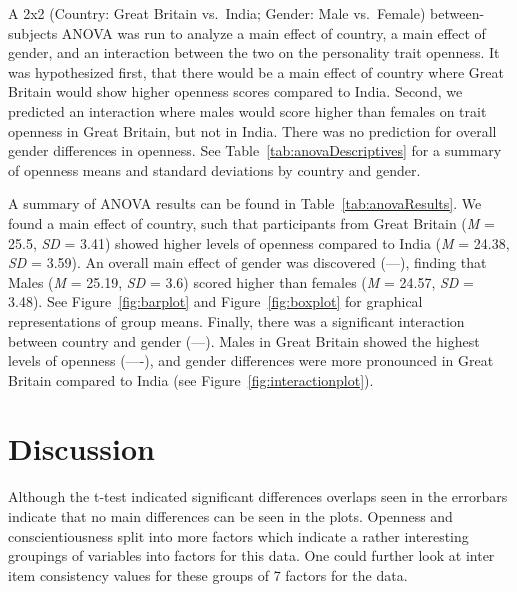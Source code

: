 \documentclass[
  english,
  man, fleqn, noextraspace]{apa6}
\begin{document}
A 2x2 (Country: Great Britain vs.~India; Gender: Male vs.~Female) between-subjects ANOVA was run to analyze a main effect of country, a main effect of gender, and an interaction between the two on the personality trait openness. It was hypothesized first, that there would be a main effect of country where Great Britain would show higher openness scores compared to India. Second, we predicted an interaction where males would score higher than females on trait openness in Great Britain, but not in India. There was no prediction for overall gender differences in openness. See Table~\ref{tab:anovaDescriptives} for a summary of openness means and standard deviations by country and gender.

A summary of ANOVA results can be found in Table~\ref{tab:anovaResults}. We found a main effect of country, such that participants from Great Britain (\emph{M} = 25.5, \emph{SD} = 3.41) showed higher levels of openness compared to India (\emph{M} = 24.38, \emph{SD} = 3.59). An overall main effect of gender was discovered (---), finding that Males (\emph{M} = 25.19, \emph{SD} = 3.6) scored higher than females (\emph{M} = 24.57, \emph{SD} = 3.48). See Figure~\ref{fig:barplot} and Figure~\ref{fig:boxplot} for graphical representations of group means. Finally, there was a significant interaction between country and gender (---). Males in Great Britain showed the highest levels of openness (----), and gender differences were more pronounced in Great Britain compared to India (see Figure~\ref{fig:interactionplot}).

\hypertarget{discussion}{%
\section{Discussion}\label{discussion}}

Although the t-test indicated significant differences overlaps seen in the errorbars indicate that no main differences can be seen in the plots. Openness and conscientiousness split into more factors which indicate a rather interesting groupings of variables into factors for this data. One could further look at inter item consistency values for these groups of 7 factors for the data.
\end{document}
